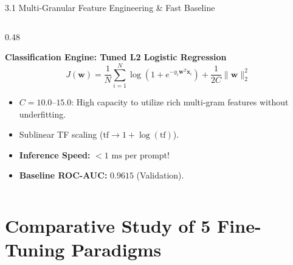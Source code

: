 \documentclass[aspectratio=169]{beamer}
\begin{document}
\begin{frame}{3.1 Multi-Granular Feature Engineering \& Fast Baseline}
\begin{columns}[T]
\begin{column}{0.48\textwidth}
\begin{block}{\textbf{Classification Engine: Tuned L2 Logistic Regression}}
$$J(\mathbf{w}) = \frac{1}{N}\sum_{i=1}^N \log(1 + e^{-y_i \mathbf{w}^T \mathbf{x}_i}) + \frac{1}{2C}\|\mathbf{w}\|_2^2$$
\begin{itemize}
    \item $C = 10.0\text{--}15.0$: High capacity to utilize rich multi-gram features without underfitting.
    \item Sublinear TF scaling ($\text{tf} \to 1 + \log(\text{tf})$).
    \item \textbf{Inference Speed:} $< 1\text{ ms}$ per prompt!
    \item \textbf{Baseline ROC-AUC:} $\mathbf{0.9615}$ (Validation).
\end{itemize}
\end{block}
\end{column}
\end{columns}
\end{frame}

\section{Comparative Study of 5 Fine-Tuning Paradigms}
\end{document}
